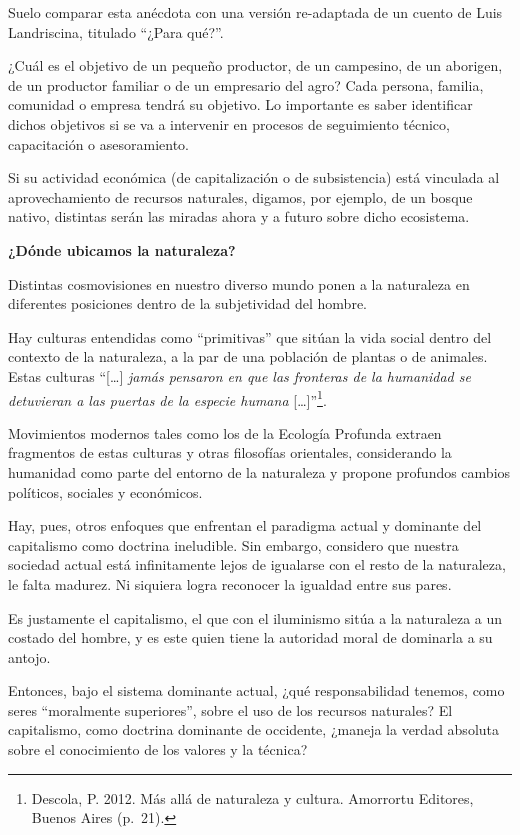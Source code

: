 \begin{fullwidth}
Suelo comparar esta anécdota con una versión re-adaptada de un cuento de
Luis Landriscina, titulado ``¿Para qué?''.

¿Cuál es el objetivo de un pequeño productor, de un campesino, de un
aborigen, de un productor familiar o de un empresario del agro? Cada
persona, familia, comunidad o empresa tendrá su objetivo. Lo importante
es saber identificar dichos objetivos si se va a intervenir en procesos
de seguimiento técnico, capacitación o asesoramiento.

Si su actividad económica (de capitalización o de subsistencia) está
vinculada al aprovechamiento de recursos naturales, digamos, por
ejemplo, de un bosque nativo, distintas serán las miradas ahora y a
futuro sobre dicho ecosistema.

\textbf{¿Dónde ubicamos la naturaleza?}

Distintas cosmovisiones en nuestro diverso mundo ponen a la naturaleza
en diferentes posiciones dentro de la subjetividad del hombre.

Hay culturas entendidas como ``primitivas'' que sitúan la vida social
dentro del contexto de la naturaleza, a la par de una población de
plantas o de animales. Estas culturas ``{[}\ldots{}{]} \emph{jamás
pensaron en que las fronteras de la humanidad se detuvieran a las
puertas de la especie humana} {[}\ldots{}{]}''\footnote{Descola, P.
  2012. Más allá de naturaleza y cultura. Amorrortu Editores, Buenos
  Aires (p.~21).}.

Movimientos modernos tales como los de la Ecología Profunda extraen
fragmentos de estas culturas y otras filosofías orientales, considerando
la humanidad como parte del entorno de la naturaleza y propone profundos
cambios políticos, sociales y económicos.

Hay, pues, otros enfoques que enfrentan el paradigma actual y dominante
del capitalismo como doctrina ineludible. Sin embargo, considero que
nuestra sociedad actual está infinitamente lejos de igualarse con el
resto de la naturaleza, le falta madurez. Ni siquiera logra reconocer la
igualdad entre sus pares.

Es justamente el capitalismo, el que con el iluminismo sitúa a la
naturaleza a un costado del hombre, y es este quien tiene la autoridad
moral de dominarla a su antojo.

Entonces, bajo el sistema dominante actual, ¿qué responsabilidad
tenemos, como seres ``moralmente superiores'', sobre el uso de los
recursos naturales? El capitalismo, como doctrina dominante de
occidente, ¿maneja la verdad absoluta sobre el conocimiento de los
valores y la técnica?


\end{fullwidth}
